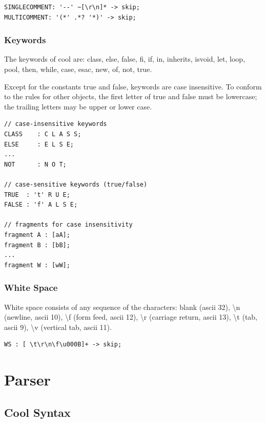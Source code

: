 \documentclass[titlepage]{article}
\begin{document}
\begin{lstlisting}[basicstyle=\ttfamily]
SINGLECOMMENT: '--' ~[\r\n]* -> skip;
MULTICOMMENT: '(*' .*? '*)' -> skip;
\end{lstlisting}

\subsubsection{Keywords}

The keywords of cool are: class, else, false, fi, if, in, inherits, isvoid, let, loop, pool, then, while, case, esac, new, of, not, true. 

Except for the constants true and false, keywords are case insensitive. To conform to the rules for other objects, the first letter of true and false must be lowercase; the trailing letters may be upper or lower case.

\begin{lstlisting}[basicstyle=\ttfamily]
// case-insensitive keywords
CLASS    : C L A S S;
ELSE     : E L S E;
...
NOT      : N O T;

// case-sensitive keywords (true/false)
TRUE  : 't' R U E;
FALSE : 'f' A L S E;

// fragments for case insensitivity
fragment A : [aA];
fragment B : [bB];
...
fragment W : [wW];
\end{lstlisting}

\subsubsection{White Space}
White space consists of any sequence of the characters: blank (ascii 32), \textbackslash{n} (newline, ascii 10), \textbackslash{f} (form feed, ascii 12), \textbackslash{r} (carriage return, ascii 13), \textbackslash{t} (tab, ascii 9), \textbackslash{v} (vertical tab, ascii 11).

\begin{lstlisting}[basicstyle=\ttfamily]
WS : [ \t\r\n\f\u000B]+ -> skip;
\end{lstlisting}

\newpage
\section{Parser}

\subsection{Cool Syntax}
\end{document}
